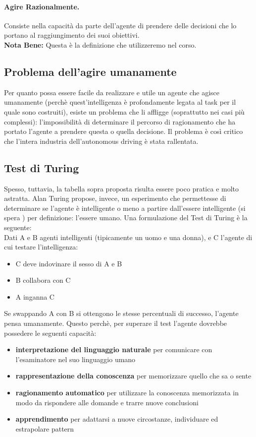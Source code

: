 \paragraph{Agire Razionalmente.} Consiste nella capacità da parte dell'agente di prendere delle decisioni che lo portano al raggiungimento dei suoi obiettivi. \\\textbf{Nota Bene: }Questa è la definizione che utilizzeremo nel corso. 

\subsection{Problema dell'agire umanamente}
Per quanto possa essere facile da realizzare e utile un agente che agisce umanamente (perchè quest'intelligenza è profondamente legata al task per il quale sono costruiti), esiste un problema che li affligge (soprattutto nei casi più complessi): 
l'impossibilità di determinare il percorso di ragionamento che ha portato l'agente a prendere questa o quella decisione. 
Il problema è così critico che l'intera industria dell'autonomous driving è stata rallentata.  


\subsection{Test di Turing}
Spesso, tuttavia, la tabella sopra proposta risulta essere poco pratica e molto astratta. 
Alan Turing propose, invece, un esperimento che permettesse di determinare se l'agente è intelligente o meno a partire dall'essere intelligente (si spera ) per definizione: l'essere umano. 
Una formulazione del Test di Turing è la seguente:\\
Dati A e B agenti intelligenti (tipicamente un uomo e una donna), e C l'agente di cui testare l'intelligenza:
\begin{itemize}
    \item C deve indovinare il sesso di A e B
    \item B collabora con C
    \item A inganna C
\end{itemize}
Se swappando A con B si ottengono le stesse percentuali di successo, l'agente pensa umanamente.
Questo perchè, per superare il test l'agente dovrebbe possedere le seguenti capacità: 
\begin{itemize}
    \item \textbf{interpretazione del linguaggio naturale} per comunicare con l'esaminatore 
    nel suo linguaggio umano    
    \item \textbf{rappresentazione della conoscenza} per memorizzare quello che sa o sente
    \item \textbf{ragionamento automatico} per utilizzare la conoscenza memorizzata in modo 
    da rispondere alle domande e trarre nuove conclusioni
    \item \textbf{apprendimento} per adattarsi a nuove circostanze, individuare ed estrapolare pattern
\end{itemize}